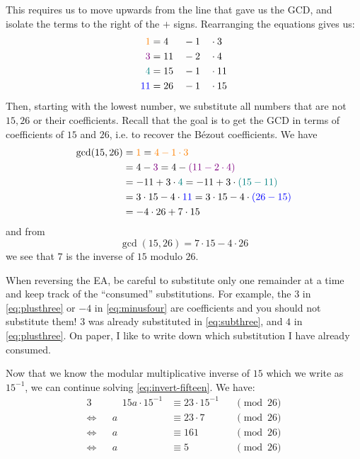 \documentclass{practice}
\begin{document}
This requires us to move upwards from the line that gave us the GCD, and isolate the terms to the right of the $+$ signs.
Rearranging the equations gives us:
\begin{alignat*}{3}
  {\color{orange}1} &= 4  &&- 1 &&\cdot 3\\
  {\color{violet}3} &= 11 &&- 2 &&\cdot 4\\
  {\color{teal}4}   &= 15 &&- 1 &&\cdot 11\\
  {\color{blue}11}  &= 26 &&- 1 &&\cdot 15
\end{alignat*}
Then, starting with the lowest number, we substitute all numbers that are not $15, 26$ or their coefficients.
Recall that the goal is to get the GCD in terms of coefficients of $15$ and $26$, i.e. to recover the Bézout coefficients.
We have
\begin{align}
  \gcd(15, 26) &= {\color{orange}1}
  = {\color{orange}4 - 1 \cdot 3}\\
  &= 4 - {\color{violet}3}
  = 4 - {\color{violet}(11 - 2 \cdot 4)}\label{eq:subthree}\\
  &= -11 + 3 \cdot {\color{teal}4}
  = -11 + 3 \cdot {\color{teal}(15 - 11)}\label{eq:plusthree}\\
  &= 3 \cdot 15 - 4 \cdot {\color{blue}11}
  = 3 \cdot 15 - 4 \cdot {\color{blue}(26 - 15)}\label{eq:minusfour}\\
  &= -4 \cdot 26 + 7 \cdot 15
\end{align}
and from
\[
  \gcd(15, 26) = 7 \cdot 15 - 4 \cdot 26
\]
we see that $7$ is the inverse of $15$ modulo $26$.

\begin{tcolorbox}[title=Tip]
  When reversing the EA, be careful to substitute only one remainder at a time and keep track of the \enquote{consumed} substitutions.
  For example, the $3$ in \eqref{eq:plusthree} or $-4$ in \eqref{eq:minusfour} are coefficients and you should not substitute them!
  $3$ was already substituted in \eqref{eq:subthree}, and $4$ in \eqref{eq:plusthree}.
  On paper, I like to write down which substitution I have already consumed.
\end{tcolorbox}

Now that we know the modular multiplicative inverse of $15$ which we write as $15^{-1}$, we can continue solving \eqref{eq:invert-fifteen}.
We have:
\begin{alignat*}{3}
  &&\quad
  15a \cdot 15^{-1} &\equiv 23 \cdot 15^{-1} &&\pmod{26}\\
  \Leftrightarrow&&
  a &\equiv 23 \cdot 7 &&\pmod{26}\\
  \Leftrightarrow&&
  a &\equiv 161 &&\pmod{26}\\
  \Leftrightarrow&&
  a &\equiv 5 &&\pmod{26}
\end{alignat*}
\end{document}
